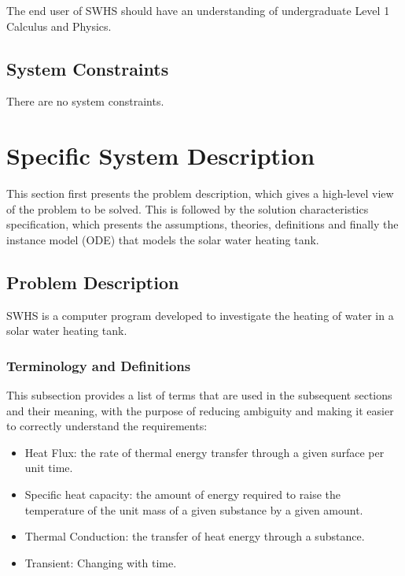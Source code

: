 \documentclass[12pt]{article}
\newcommand{\progname}{SWHS}
\begin{document}
The end user of \progname{} should have an understanding of undergraduate Level
1 Calculus and Physics.

\subsection{System Constraints}

There are no system constraints.

\section{Specific System Description}

This section first presents the problem description, which gives a high-level
view of the problem to be solved.  This is followed by the solution characteristics
specification, which presents the assumptions, theories, definitions and finally
the instance model (ODE) that models the solar water heating tank.%

\subsection{Problem Description} \label{Sec_pd}

\progname{} is a computer program developed to investigate the 
heating of water in a solar water heating tank.


\subsubsection{Terminology and  Definitions}

This subsection provides a list of terms that are used in the subsequent
sections and their meaning, with the purpose of reducing ambiguity and making it
easier to correctly understand the requirements:

\begin{itemize}

\item Heat Flux: the rate of thermal energy transfer through a given surface per unit time.


\item Specific heat capacity: the amount of energy required to raise the temperature of the unit mass of a given substance by a given amount.

\item Thermal Conduction: the transfer of heat energy through a substance.

\item Transient: Changing with time.

\end{itemize}
\end{document}
